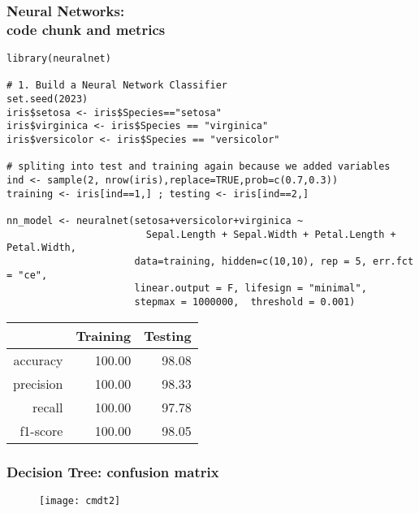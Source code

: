 \documentclass[border=5mm, convert, usenames, dvipsnames,beamer]{standalone}
\begin{document}
\begin{frame}[ fragile]{}
\frametitle{Neural Networks: \\ code chunk and metrics}

\vspace{40}
\noindent


\begin{lstlisting}[style=R]
library(neuralnet)

# 1. Build a Neural Network Classifier
set.seed(2023)
iris$setosa <- iris$Species=="setosa"
iris$virginica <- iris$Species == "virginica"
iris$versicolor <- iris$Species == "versicolor"

# spliting into test and training again because we added variables
ind <- sample(2, nrow(iris),replace=TRUE,prob=c(0.7,0.3))
training <- iris[ind==1,] ; testing <- iris[ind==2,]

nn_model <- neuralnet(setosa+versicolor+virginica ~ 
                        Sepal.Length + Sepal.Width + Petal.Length + Petal.Width, 
                      data=training, hidden=c(10,10), rep = 5, err.fct = "ce", 
                      linear.output = F, lifesign = "minimal",
                      stepmax = 1000000,  threshold = 0.001)
\end{lstlisting}


\begin{table}[ht]
\centering
\begin{tabular}{rrr}
  \hline
 & Training & Testing \\ 
  \hline
accuracy & 100.00 & 98.08 \\ 
  precision & 100.00 & 98.33 \\ 
  recall & 100.00 & 97.78 \\ 
  f1-score & 100.00 & 98.05 \\ 
   \hline
\end{tabular}
\end{table}



\end{frame}



\begin{frame}[ fragile]{}
\frametitle{Decision Tree: confusion matrix}

\vspace{40}
\noindent

\vspace{-5mm}
\begin{figure}[h!]
\begin{center}
\texttt{[image: cmdt2]}
\end{center}
\end{figure}

\end{frame}
\end{document}
